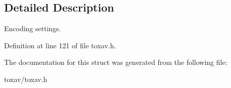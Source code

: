 \subsection{Detailed Description}
Encoding settings. 

Definition at line 121 of file toxav.\+h.



The documentation for this struct was generated from the following file\+:\begin{DoxyCompactItemize}
\item 
toxav/toxav.\+h\end{DoxyCompactItemize}
